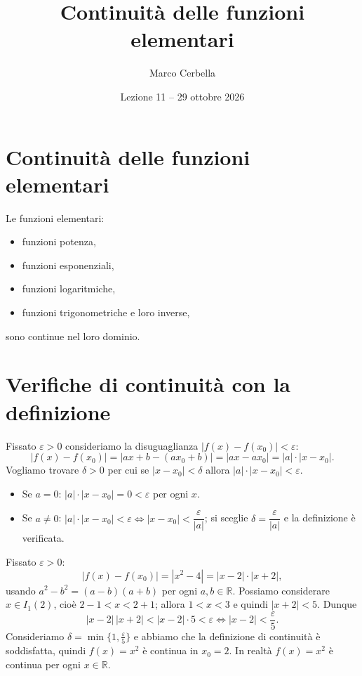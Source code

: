\documentclass[11pt,a4paper]{article}
\title{Continuità delle funzioni elementari}
\author{Marco Cerbella}
\date{Lezione 11 -- 29 ottobre 2026}
\begin{document}
\maketitle

\section{Continuità delle funzioni elementari}

Le funzioni elementari:
\begin{itemize}
    \item funzioni potenza,
    \item funzioni esponenziali,
    \item funzioni logaritmiche,
    \item funzioni trigonometriche e loro inverse,
\end{itemize}
sono continue nel loro dominio.

\section{Verifiche di continuità con la definizione}

\begin{esempio}[$f(x) = ax + b$ è continua in ogni $x_0 \in \mathbb{R}$, con $a, b \in \mathbb{R}$]
Fissato $\varepsilon > 0$ consideriamo la disuguaglianza $|f(x) - f(x_0)| < \varepsilon$:
\[
|f(x) - f(x_0)| = |ax + b - (ax_0 + b)| = |ax - ax_0| = |a|\cdot|x - x_0| .
\]
Vogliamo trovare $\delta > 0$ per cui se $|x - x_0| < \delta$ allora $|a|\cdot|x - x_0| < \varepsilon$.
\begin{itemize}
    \item Se $a = 0$: $|a|\cdot|x-x_0| = 0 < \varepsilon$ per ogni $x$.
    \item Se $a \neq 0$: $|a|\cdot|x - x_0| < \varepsilon \iff |x - x_0| < \dfrac{\varepsilon}{|a|}$; si sceglie $\delta = \dfrac{\varepsilon}{|a|}$ e la definizione è verificata.
\end{itemize}
\end{esempio}

\begin{esempio}[$f(x) = x^2$ è continua in $x_0 = 2$]
Fissato $\varepsilon > 0$:
\[
|f(x) - f(x_0)| = |x^2 - 4| = |x - 2|\cdot|x + 2| ,
\]
usando $a^2 - b^2 = (a - b)(a + b)$ per ogni $a, b \in \mathbb{R}$. Possiamo considerare $x \in I_1(2)$, cioè $2 - 1 < x < 2 + 1$; allora $1 < x < 3$ e quindi $|x + 2| < 5$. Dunque
\[
|x - 2|\,|x + 2| < |x - 2| \cdot 5 < \varepsilon \iff |x - 2| < \frac{\varepsilon}{5} .
\]
Consideriamo $\delta = \min\{1, \frac{\varepsilon}{5}\}$ e abbiamo che la definizione di continuità è soddisfatta, quindi $f(x) = x^2$ è continua in $x_0 = 2$. In realtà $f(x) = x^2$ è continua per ogni $x \in \mathbb{R}$.
\end{esempio}
\end{document}
